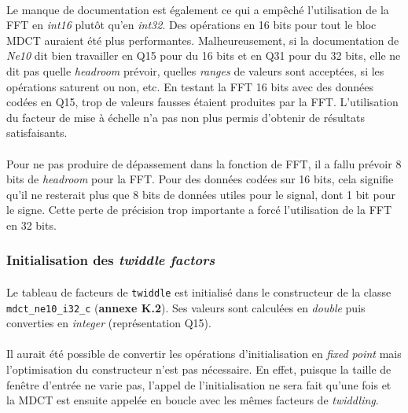 \documentclass{article}
\begin{document}
    \paragraph{}
    Le manque de documentation est également ce qui a empêché l'utilisation de la FFT en \emph{int16} plutôt qu'en \emph{int32}. Des opérations en 16 bits pour tout le bloc MDCT auraient été plus performantes. Malheureusement, si la documentation de \emph{Ne10} dit bien travailler en Q15 pour du 16 bits et en Q31 pour du 32 bits, elle ne dit pas quelle \emph{headroom} prévoir, quelles \emph{ranges} de valeurs sont acceptées, si les opérations saturent ou non, etc. En testant la FFT 16 bits avec des données codées en Q15, trop de valeurs fausses étaient produites par la FFT. L'utilisation du facteur de mise à échelle n'a pas non plus permis d'obtenir de résultats satisfaisants.

    \paragraph{}
    Pour ne pas produire de dépassement dans la fonction de FFT, il a fallu prévoir 8 bits de \emph{headroom} pour la FFT. Pour des données codées sur 16 bits, cela signifie qu'il ne resterait plus que 8 bits de données utiles pour le signal, dont 1 bit pour le signe. Cette perte de précision trop importante a forcé l'utilisation de la FFT en 32 bits.


    \subsubsection{Initialisation des \emph{twiddle factors}}
    \paragraph{}
    Le tableau de facteurs de \texttt{twiddle} est initialisé dans le constructeur de la classe \texttt{mdct\_ne10\_i32\_c} (\textbf{annexe K.2}). Ses valeurs sont calculées en \emph{double} puis converties en \emph{integer} (représentation Q15).
    
    \paragraph{}
    Il aurait été possible de convertir les opérations d'initialisation en \emph{fixed point} mais l'optimisation du constructeur n'est pas nécessaire. En effet, puisque la taille de fenêtre d'entrée ne varie pas, l'appel de l'initialisation ne sera fait qu'une fois et la MDCT est ensuite appelée en boucle avec les mêmes facteurs de \emph{twiddling}.
\end{document}
